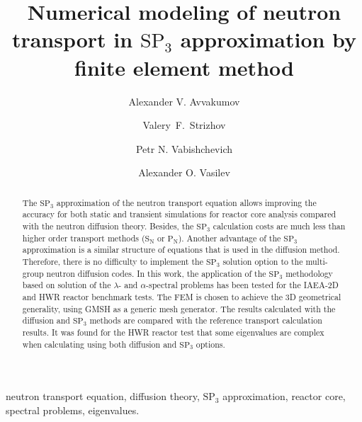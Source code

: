 \documentclass[authoryear]{elsarticle}
\begin{document}
\begin{frontmatter}

\title{Numerical modeling of neutron transport in $\mathrm{SP_3}$ approximation by finite element method}

\author[ki]{Alexander V. Avvakumov}

\author[nsi]{Valery~F.~Strizhov}

\author[nsi,univ]{Petr N. Vabishchevich}

\author[univ]{Alexander O. Vasilev}

\address[ki]{National Research Center \emph{Kurchatov Institute},  1, Sq. Academician Kurchatov, Moscow, Russia}
\address[nsi]{Nuclear Safety Institute, Russian Academy of Sciences, 52, B. Tulskaya, Moscow, Russia}
\address[univ]{North-Eastern Federal University, 58, Belinskogo, Yakutsk, Russia}


\begin{abstract}
The $\mathrm{SP_3}$ approximation of the neutron transport equation allows improving the accuracy for both static and transient simulations for reactor core analysis compared with the neutron diffusion theory. 
Besides, the $\mathrm{SP_3}$ calculation costs are much less than higher order transport methods ($\mathrm{S_N}$ or $\mathrm{P_N}$). 
Another advantage of the $\mathrm{SP_3}$ approximation is a similar structure of equations that is used in the diffusion method. 
Therefore, there is no difficulty to implement the $\mathrm{SP_3}$ solution option to the multi-group neutron diffusion codes. 
In this work, the application of the $\mathrm{SP_3}$ methodology based on solution of the $\lambda$- and $\alpha$-spectral problems has been tested for the IAEA-2D and HWR reactor benchmark tests. 
The FEM is chosen to achieve the 3D geometrical generality, using GMSH as a generic mesh generator. 
The results calculated with the diffusion and $\mathrm{SP_3}$ methods are compared with the reference transport calculation results. 
It was found for the HWR reactor test that some eigenvalues are complex when calculating using both diffusion and $\mathrm{SP_3}$ options.
\end{abstract}

\begin{keyword}
neutron transport equation, diffusion theory, $\mathrm{SP_3}$ approximation, reactor core, spectral problems, eigenvalues.

\end{keyword}

\end{frontmatter}
\end{document}
